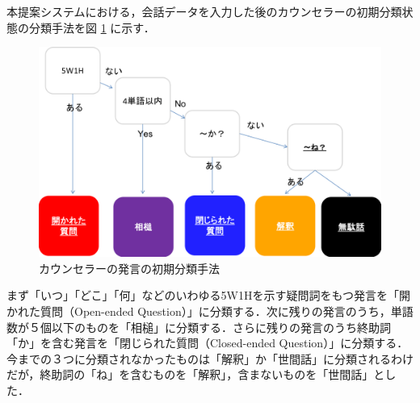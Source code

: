 \documentclass[shuuron]{kuee}
\begin{document}


本提案システムにおける，会話データを入力した後のカウンセラーの初期分類状態の分類手法を図
\ref{fig:5_2}
に示す．
\begin{figure}
  \begin{center}
    \includegraphics[width=\linewidth]{5_2.png}
  \end{center}
  \caption{カウンセラーの発言の初期分類手法}
  \label{fig:5_2}
\end{figure}
まず「いつ」「どこ」「何」などのいわゆる5W1Hを示す疑問詞をもつ発言を「開かれた質問（Open-ended Question）」に分類する．次に残りの発言のうち，単語数が５個以下のものを「相槌」に分類する．さらに残りの発言のうち終助詞「か」を含む発言を「閉じられた質問（Closed-ended Question）」に分類する．今までの３つに分類されなかったものは「解釈」か「世間話」に分類されるわけだが，終助詞の「ね」を含むものを「解釈」，含まないものを「世間話」とした．
\end{document}
